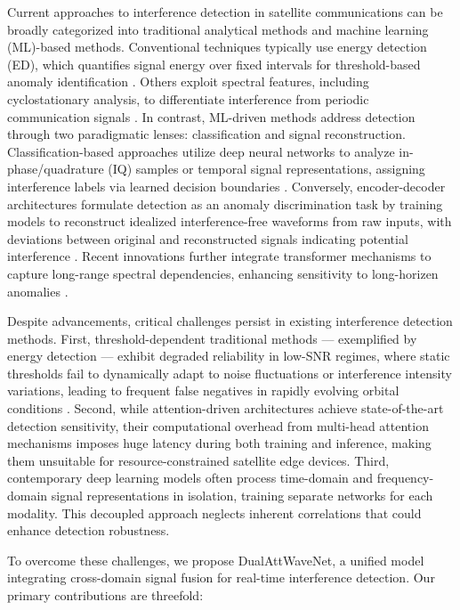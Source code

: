 \documentclass[conference]{IEEEtran}
\begin{document}
Current approaches to interference detection in satellite communications can be broadly categorized into traditional analytical methods and machine learning (ML)-based methods. Conventional techniques typically use  energy detection (ED), which quantifies signal energy over fixed intervals for threshold-based anomaly identification \cite{kay2009fundamentals}. Others exploit spectral features, including cyclostationary analysis, to differentiate interference from periodic communication signals \cite{experimentalCyclostationary}. In contrast, ML-driven methods address detection through two paradigmatic lenses: classification and signal reconstruction. Classification-based approaches utilize deep neural networks to analyze in-phase/quadrature (IQ) samples or temporal signal representations, assigning interference labels via learned decision boundaries \cite{pellacoSpectrumPredictionInterference2019}. Conversely, encoder-decoder architectures formulate detection as an anomaly discrimination task by training models to reconstruct idealized interference-free waveforms from raw inputs, with deviations between original and reconstructed signals indicating potential interference \cite{saifaldawlaConvolutionalAutoencodersNonGeostationary2024}. Recent innovations further integrate transformer mechanisms to capture long-range spectral dependencies, enhancing sensitivity to long-horizen anomalies \cite{saifaldawlaGenAIBasedModelsNGSO2024}.

Despite advancements, critical challenges persist in existing interference detection methods. First, threshold-dependent traditional methods — exemplified by energy detection — exhibit degraded reliability in low-SNR regimes, where static thresholds fail to dynamically adapt to noise fluctuations or interference intensity variations, leading to frequent false negatives in rapidly evolving orbital conditions \cite{saifaldawlaGenAIBasedModelsNGSO2024}. Second, while attention-driven architectures achieve state-of-the-art detection sensitivity, their computational overhead from multi-head attention mechanisms imposes huge latency during both training and inference, making them unsuitable for resource-constrained satellite edge devices. Third, contemporary deep learning models often process time-domain and frequency-domain signal representations in isolation, training separate networks for each modality. This decoupled approach neglects inherent correlations that could enhance detection robustness.

To overcome these challenges, we propose DualAttWaveNet, a unified model integrating cross-domain signal fusion for real-time interference detection. Our primary contributions are threefold:
\end{document}
